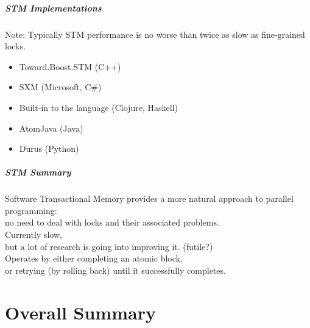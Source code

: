 \begin{frame}
  \frametitle{STM Implementations}



  Note: Typically STM performance is no worse than twice as slow as
  fine-grained locks.

  \begin{itemize}
    \item Toward.Boost.STM (C++)

    \item SXM (Microsoft, C\#)

    \item Built-in to the language (Clojure, Haskell)

    \item AtomJava (Java)

    \item Durus (Python)
  \end{itemize}

\end{frame}

\begin{frame}
  \frametitle{STM Summary}


     Software Transactional Memory provides a more natural approach to
      parallel programming: \\ \qquad no need to deal with locks and their associated problems.\\[1em]

     Currently slow,\\ \qquad but a lot of research is going into improving it. (futile?)\\[1em]

     Operates by either completing an atomic block,\\ or retrying (by rolling
      back) until it successfully completes.

\end{frame}
\part{Overall Summary}
\frame{\partpage}

